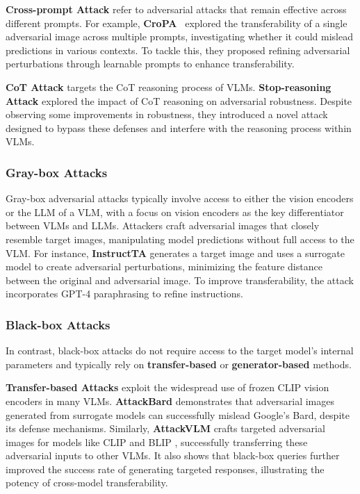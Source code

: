 \textbf{Cross-prompt Attack} refer to adversarial attacks that remain effective across different prompts. For example, \textbf{CroPA}~\cite{luo2024image} explored the transferability of a single adversarial image across multiple prompts, investigating whether it could mislead predictions in various contexts. To tackle this, they proposed refining adversarial perturbations through learnable prompts to enhance transferability.


\textbf{CoT Attack} targets the CoT reasoning process of VLMs. \textbf{Stop-reasoning Attack} \cite{wang2024stop} explored the impact of CoT reasoning on adversarial robustness. Despite observing some improvements in robustness, they introduced a novel attack designed to bypass these defenses and interfere with the reasoning process within VLMs.





\subsubsection{Gray-box Attacks}
Gray-box adversarial attacks typically involve access to either the vision encoders or the LLM of a VLM, with a focus on vision encoders as the key differentiator between VLMs and LLMs. Attackers craft adversarial images that closely resemble target images, manipulating model predictions without full access to the VLM.
For instance, \textbf{InstructTA} \cite{wang2023instructta} generates a target image and uses a surrogate model to create adversarial perturbations, minimizing the feature distance between the original and adversarial image. To improve transferability, the attack incorporates GPT-4 paraphrasing to refine instructions.

\subsubsection{Black-box Attacks}

In contrast, black-box attacks do not require access to the target model's internal parameters and typically rely on \textbf{transfer-based} or \textbf{generator-based} methods. 



\textbf{Transfer-based Attacks} exploit the widespread use of frozen CLIP vision encoders in many VLMs. \textbf{AttackBard} \cite{dong2023robust} demonstrates that adversarial images generated from surrogate models can successfully mislead Google's Bard, despite its defense mechanisms. Similarly, \textbf{AttackVLM} \cite{zhao2024evaluating} crafts targeted adversarial images for models like CLIP \cite{radford2021learning} and BLIP \cite{BLIP-2}, successfully transferring these adversarial inputs to other VLMs. It also shows that black-box queries further improved the success rate of generating targeted responses, illustrating the potency of cross-model transferability. 

